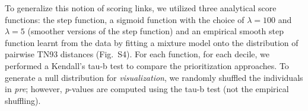 \documentclass[a4paper,11pt]{article}
\begin{document}
To generalize this notion of scoring links,
we utilized three analytical score functions:
the 
step function, 
a sigmoid function %
with the choice of $\lambda=100$  and $\lambda=5$ (smoother versions of the step function) and
an empirical smooth step function learnt from the data by fitting a mixture model onto the distribution of pairwise TN93 distances 
(Fig.~S4).
For each function,
for each decile, %
we performed a Kendall's tau-b test to compare the prioritization approaches.\supercite{Kendall1938}
To generate a null distribution for \textit{visualization}, we randomly shuffled the individuals in \textit{pre}; however, \textit{p}-values are computed using the tau-b test (not the empirical shuffling).


\end{document}
